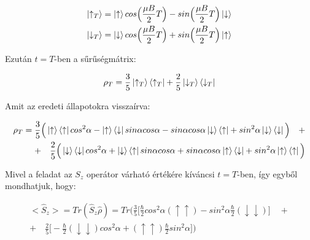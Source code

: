 \documentclass[a4paper,12pt]{article}
\begin{document}
\begin{equation*}
\begin{gathered}
\ket{\uparrow_{T}} = \ket{\uparrow}cos\Big(\frac{\mu B}{2} T\Big) - sin\Big(\frac{\mu B}{2}T\Big)\ket{\downarrow} \\
\ket{\downarrow_{T}} = \ket{\downarrow}cos\Big(\frac{\mu B}{2} T\Big) + sin\Big(\frac{\mu B}{2}T\Big)\ket{\uparrow}
\end{gathered}
\end{equation*}

\par Ezután $t = T$-ben a sűrűségmátrix:

\begin{equation*}
\rho_{T} = \frac{3}{5}\ket{\uparrow_{T}}\bra{\uparrow_{T}} + \frac{2}{5}\ket{\downarrow_{T}}\bra{\downarrow_{T}}
\end{equation*}

\par Amit az eredeti állapotokra visszaírva:

\begin{equation*}
\begin{split}
\rho_{T} = \frac{3}{5}\Big( \ket{\uparrow}\bra{\uparrow}cos^{2}\alpha - \ket{\uparrow}\bra{\downarrow}sin\alpha cos\alpha - sin\alpha cos\alpha\ket{\downarrow}\bra{\uparrow} + sin^{2}\alpha \ket{\downarrow}\bra{\downarrow}\Big) \quad + \\
+ \quad \frac{2}{5}\Big( \ket{\downarrow}\bra{\downarrow}cos^{2}\alpha + \ket{\downarrow}\bra{\uparrow}sin\alpha cos\alpha + sin\alpha cos\alpha \ket{\uparrow}\bra{\downarrow} + sin^{2}\alpha \ket{\uparrow}\bra{\uparrow}\Big)
\end{split}
\end{equation*}

\par Mivel a feladat az $S_{z}$ operátor várható értékére kíváncsi $t=T$-ben, így egyből mondhatjuk, hogy:

\begin{equation*}
\begin{gathered}
<\hat{S}_{z}> = Tr(\hat{S}_{z}\hat{\rho}) = Tr\Big( \frac{3}{5}\Big[ \frac{\hbar}{2}cos^{2}\alpha (\uparrow\uparrow) - sin^{2}\alpha \frac{\hbar}{2} (\downarrow\downarrow) \Big] \quad + \\
+ \quad \frac{2}{5}\Big[ -\frac{\hbar}{2}(\downarrow\downarrow)cos^{2}\alpha + (\uparrow\uparrow)\frac{\hbar}{2}sin^{2}\alpha\Big] \Big)
\end{gathered}
\end{equation*}
\end{document}
